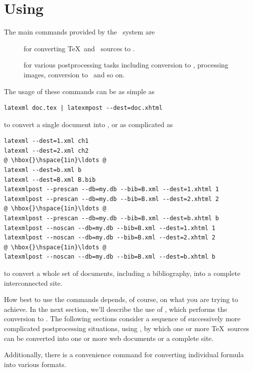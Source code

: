 \documentclass{book}
\begin{document}
\chapter{Using \LaTeXML}\label{usage}
The main commands provided by the \LaTeXML\ system are
\begin{description}
\item[] for converting \TeX\ and \BibTeX\ sources to \XML.
\item[] for various postprocessing tasks including
conversion to \HTML, processing images, conversion to \MathML\ and so on.
\end{description}
\noindent The usage of these commands can be as simple as
\begin{lstlisting}[style=shell]
latexml doc.tex | latexmpost --dest=doc.xhtml
\end{lstlisting}
\noindent to convert a single document into \XHTML,  or as complicated as
\begin{lstlisting}[style=shell]
latexml --dest=1.xml ch1
latexml --dest=2.xml ch2
@ \hbox{}\hspace{1in}\ldots @
latexml --dest=b.xml b
latexml --dest=B.xml B.bib
latexmlpost --prescan --db=my.db --bib=B.xml --dest=1.xhtml 1
latexmlpost --prescan --db=my.db --bib=B.xml --dest=2.xhtml 2
@ \hbox{}\hspace{1in}\ldots @
latexmlpost --prescan --db=my.db --bib=B.xml --dest=b.xhtml b
latexmlpost --noscan --db=my.db --bib=B.xml --dest=1.xhtml 1
latexmlpost --noscan --db=my.db --bib=B.xml --dest=2.xhtml 2
@ \hbox{}\hspace{1in}\ldots @
latexmlpost --noscan --db=my.db --bib=B.xml --dest=b.xhtml b
\end{lstlisting}
\noindent to convert a whole set of documents, including a bibliography,
into a complete interconnected site.

How best to use the commands depends, of course, on what you
are trying to achieve.  In the next section, we'll describe
the use of , which performs the conversion to \XML.
The following sections consider a sequence of
successively more complicated postprocessing situations,
using ,
by which one or more \TeX\ sources can be converted into
one or more web documents or a complete site.

Additionally, there is a convenience command 
for converting individual formula into various formats.
\end{document}
